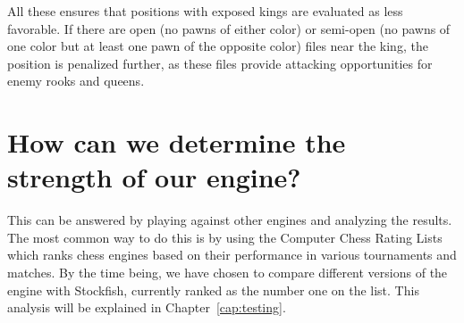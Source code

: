 \vspace{1em}

\noindent All these ensures that positions with exposed kings are evaluated as less favorable. If there are open (no pawns of either color) or semi-open (no pawns of one color but at least one pawn of the opposite color) files near the king, the position is penalized further, as these files provide attacking opportunities for enemy rooks and queens.

\vspace{1em}

\section{How can we determine the strength of our engine?}

This can be answered by playing against other engines and analyzing the results. The most common way to do this is by using the Computer Chess Rating Lists which ranks chess engines based on their performance in various tournaments and matches. By the time being, we have chosen to compare different versions of the engine with Stockfish, currently ranked as the number one on the list. This analysis will be explained in Chapter~\ref{cap:testing}.





